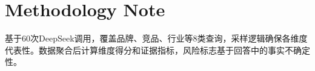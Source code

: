 \documentclass[11pt]{article}
\begin{document}
\section*{Methodology Note}
基于60次DeepSeek调用，覆盖品牌、竞品、行业等8类查询，采样逻辑确保各维度代表性。数据聚合后计算维度得分和证据指标，风险标志基于回答中的事实不确定性。
\end{document}
